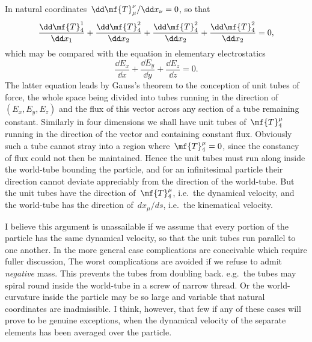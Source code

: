 \documentclass[12pt]{book}
\begin{document}
In natural coordinates~$\dd\mf{T}^\nu_\mu/\dd x_\nu = 0$, so that
\[
\frac{\dd\mf{T}^1_4}{\dd x_1} + \frac{\dd\mf{T}^2_4}{\dd x_2} + \frac{\dd\mf{T}^2_4}{\dd x_2} + \frac{\dd\mf{T}^2_4}{\dd x_2} = 0,
\]
which may be compared with the equation in elementary electrostatics
\[
\frac{\dd E_x}{\dd x} + \frac{\dd E_y}{\dd y} + \frac{\dd E_z}{\dd z} = 0.
\]
The latter equation leads by Gauss's theorem to the conception of unit tubes of force, the whole space being divided
into tubes running in the direction of~$(E_x,E_y,E_z)$ and the flux of this vector across any section of a tube
remaining constant.
Similarly in four dimensions we shall have unit tubes of~$\mf{T}^\mu_4$ running in the direction of the vector and
containing constant flux.
Obviously such a tube cannot stray into a region where~$\mf{T}^\mu_4 = 0$, since the constancy of flux could not
then be maintained.
Hence the unit tubes must run along inside the world-tube bounding the particle, and for an infinitesimal particle
their direction cannot deviate appreciably from the direction of the world-tube.
But the unit tubes have the direction of~$\mf{T}^\mu_4$, i.e.\ the dynamical velocity, and the world-tube has the
direction of~$dx_\mu/ds$, i.e.\ the kinematical velocity.

I believe this argument is unassailable if we assume that every portion of the particle has the same dynamical
velocity, so that the unit tubes run parallel to one another.
In the more general case complications are conceivable which require fuller discussion\footnotemark,\footnotetext
   {The worst complications are avoided if we refuse to admit \emph{negative} mass.
     This prevents the tubes from doubling back.}
e.g.\ the tubes may spiral round inside the world-tube in a screw of narrow thread.
Or the world-curvature inside the particle may be so large and variable that natural coordinates are inadmissible.
I think, however, that few if any of these cases will prove to be genuine exceptions, when the dynamical velocity
of the separate elements has been averaged over the particle.

%
%
%
\end{document}
